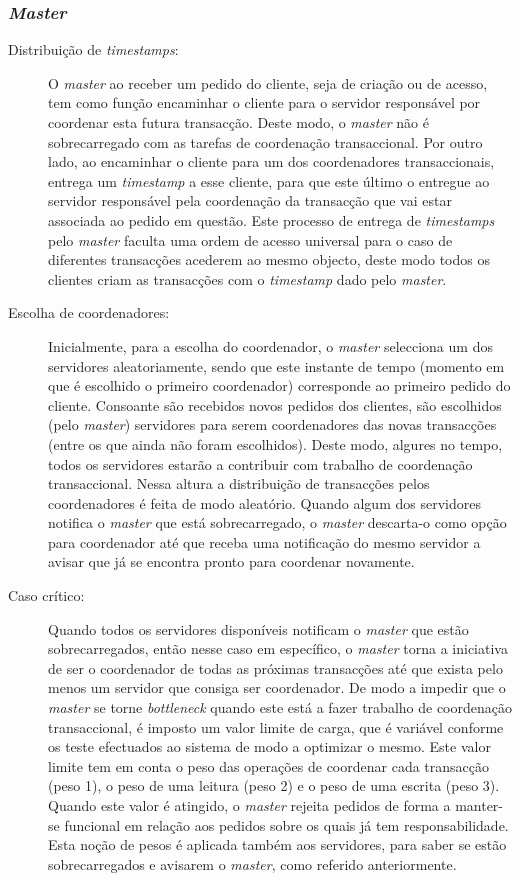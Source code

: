 \subsubsection{\textit{Master}}

\begin{description}

\item[Distribuição de \textit{timestamps}:]
O \textit{\textit{master}} ao receber um pedido do cliente, seja de criação ou de acesso, tem como função encaminhar o cliente para o servidor responsável por coordenar esta futura transacção. Deste modo, o \textit{master} não é sobrecarregado com as tarefas de coordenação transaccional. Por outro lado, ao encaminhar o cliente para um dos coordenadores transaccionais, entrega um \textit{timestamp} a esse cliente, para que este último o entregue ao servidor responsável pela coordenação da transacção que vai estar associada ao pedido em questão. Este processo de entrega de \textit{timestamps} pelo \textit{master} faculta uma ordem de acesso universal para o caso de diferentes transacções acederem ao mesmo objecto, deste modo todos os clientes criam as transacções com o \textit{timestamp} dado pelo \textit{master}.

\item[Escolha de coordenadores:]
Inicialmente, para a escolha do coordenador, o \textit{master} selecciona um dos servidores aleatoriamente, sendo que este instante de tempo (momento em que é escolhido o primeiro coordenador) corresponde ao primeiro pedido do cliente. Consoante são recebidos novos pedidos dos clientes, são escolhidos (pelo \textit{master}) servidores para serem coordenadores das novas transacções (entre os que ainda não foram escolhidos). Deste modo, algures no tempo, todos os servidores estarão a contribuir com trabalho de coordenação transaccional. Nessa altura a distribuição de transacções pelos coordenadores é feita de modo aleatório. Quando algum dos servidores notifica o \textit{master} que está  sobrecarregado, o \textit{master} descarta-o como opção para coordenador até que receba uma notificação do mesmo servidor a avisar que já se encontra pronto para coordenar novamente.

\item[Caso crítico:]
Quando todos os servidores disponíveis notificam o \textit{master} que estão sobrecarregados, então nesse caso em específico, o \textit{master} torna a iniciativa de ser o coordenador de todas as próximas transacções até que exista pelo menos um servidor que consiga ser coordenador. De modo a impedir que o \textit{master} se torne \textit{bottleneck} quando este está a fazer trabalho de coordenação transaccional, é imposto um valor limite de carga, que é variável conforme os teste efectuados ao sistema de modo a optimizar o mesmo. Este valor limite tem em conta o peso das operações de coordenar cada transacção (peso 1), o peso de uma leitura (peso 2) e o peso de uma escrita (peso 3). Quando este valor é atingido, o \textit{master} rejeita pedidos de forma a manter-se funcional em relação aos pedidos sobre os quais já tem responsabilidade. Esta noção de pesos é aplicada também aos servidores, para saber se estão sobrecarregados e avisarem o \textit{master}, como referido anteriormente.


\end{description}
